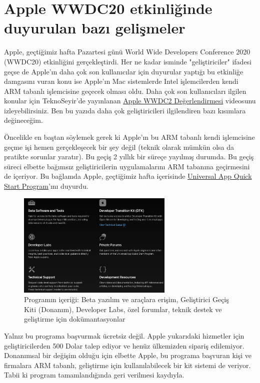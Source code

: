 \documentclass[11pt]{article}
\begin{document}
\section{Apple WWDC20 etkinliğinde duyurulan bazı gelişmeler}
\label{sec:org8a1c36c}
Apple, geçtiğimiz hafta Pazartesi günü World Wide Developers Conference 2020
(WWDC20) etkinliğini gerçekleştirdi. Her ne kadar isminde "geliştiriciler"
ifadesi geçse de Apple'ın daha çok son kullanıcılar için duyurular yaptığı bu
etkinliğe damgasını vuran konu ise Apple'ın Mac sistemlerde Intel
işlemcilerden kendi ARM tabanlı işlemcisine geçecek olması oldu. Daha çok son
kullanıcıları ilgilen konular için TeknoSeyir'de yayınlanan \href{https://teknoseyir.com/apple-wwdc20-degerlendirmesi}{Apple WWDC2
Değerlendirmesi} videosunu izleyebilirsiniz. Ben bu yazıda daha çok
geliştiricileri ilgilendiren bazı kısımlara değineceğim.

Öncelikle en baştan söylemek gerek ki Apple'ın bu ARM tabanlı kendi
işlemcisine geçme işi hemen gerçekleşecek bir şey değil (teknik olarak mümkün
olsa da pratikte sorunlar yaratır). Bu geçiş 2 yıllık bir süreçe yayılmış
durumda. Bu geçiş süreci elbette bağımsız geliştiricilerin uygulamalarını ARM
tabanına geçirmesini de içeriyor. Bu bağlamda Apple, geçtiğimiz hafta
içerisinde \href{https://developer.apple.com/programs/universal/}{Universal App Quick Start Program}'ını duyurdu.

\begin{figure}[htbp]
\centering
\includegraphics[height=5cm]{gorseller/apple-universal-app-quick-start-program.png}
\caption{Programın içeriği: Beta yazılım ve araçlara erişim, Geliştirici Geçiş Kiti (Donanım), Developer Labs, özel forumlar, teknik destek ve geliştirme için dokümantasyonlar}
\end{figure}

Yalnız bu programa başvurmak ücretsiz değil. Apple yukarıdaki hizmetler için
geliştiricilerden 500 Dolar talep ediyor ve henüz ülkemizden sipariş
edilemiyor. Donanımsal bir değişim olduğu için elbette Apple, bu programa
başvuran kişi ve firmalara ARM tabanlı, geliştirme için kullanılabilecek bir
kit sistemi de veriyor. Tabii ki program tamamlandığında geri verilmesi
kaydıyla.
\end{document}
